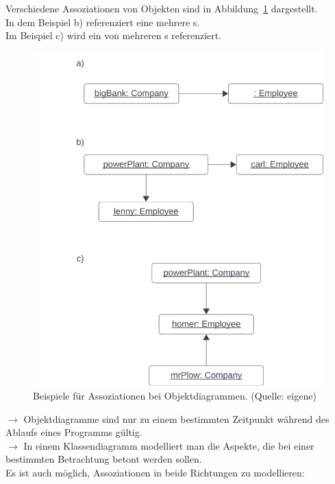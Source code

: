 \noindent
Verschiedene Assoziationen von Objekten sind in Abbildung~\ref{fig:objectassociations} dargestellt.\\
In dem Beispiel b) referenziert eine  mehrere s.\\
Im Beispiel c) wird ein  von mehreren s referenziert.\\

\begin{figure}
    \centering
    \includegraphics[scale=0.5]{chapters/fopt3/img/objectassociations}
    \caption{Beispiele für Assoziationen bei Objektdiagrammen. (Quelle: eigene)}
    \label{fig:objectassociations}
\end{figure}

\noindent
$\rightarrow$ Objektdiagramme sind nur zu einem bestimmten Zeitpunkt während des Ablaufs eines Programms gültig.\\

\noindent
$\rightarrow$ In einem Klassendiagramm modelliert man die Aspekte, die bei einer bestimmten Betrachtung betont werden sollen.\\

\noindent
Es ist auch möglich, Assoziationen in beide Richtungen zu modellieren:

